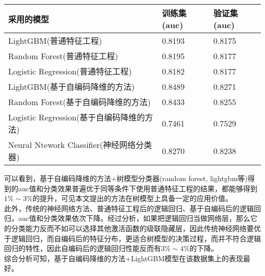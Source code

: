 \begin{center}
    \begin{tabular}{lll}
        \hline
        采用的模型                                & 训练集(auc) & 验证集(auc) \\
        \hline
        LightGBM(普通特征工程)                    & 0.8193      & 0.8175      \\
        \hline
        Random Forest(普通特征工程)               & 0.8195      & 0.8177      \\
        \hline
        Logistic Regression(普通特征工程)         & 0.8182      & 0.8177      \\
        \hline
        LightGBM(基于自编码降维的方法)            & 0.8489      & 0.8271      \\
        \hline
        Random Forest(基于自编码降维的方法)       & 0.8433      & 0.8255      \\
        \hline
        Logistic Regression(基于自编码降维的方法) & 0.7461      & 0.7529      \\
        \hline
        Neural Ntework Classifier(神经网络分类器) & 0.8270      & 0.8238      \\
        \hline
    \end{tabular}
\end{center}


可以看到，基于自编码降维的方法+树模型分类器(random forest, lightgbm等)得到的auc值和分类效果普遍优于同等条件下使用普通特征工程的结果，都能够得到$1\%\sim3\%$的提升，可见本文提出的方法在树模型上具备一定的应用价值。\\

此外，传统的神经网络方法、普通特征工程后的逻辑回归、基于自编码后的逻辑回归，auc值和分类效果依次下降。经过分析，如果把逻辑回归当做网络层，那么它的分类能力反而不如可以选择其他激活函数的级联隐藏层，因此传统神经网络要优于逻辑回归，而自编码后的特征分布，更适合树模型的决策过程，而并不符合逻辑回归的特性，因此自编码后的逻辑回归性能反而有$3\%\sim4\%$的下降。\\

综合分析可知，基于自编码降维的方法+LightGBM模型在该数据集上的表现最好。